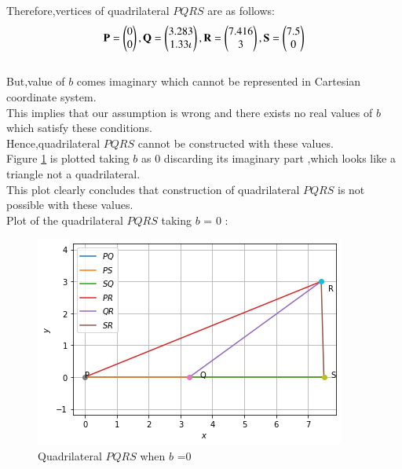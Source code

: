 \documentclass[journal,12pt,twocolumn]{IEEEtran}
\begin{document}
Therefore,vertices of quadrilateral $PQRS$ are as follows:
\begin{align}
\mathbf{P} = \begin{pmatrix}0\\0\end{pmatrix}, \mathbf{Q} = \begin{pmatrix}3.283\\1.33\iota\end{pmatrix}, \mathbf{R} = \begin{pmatrix}7.416\\3\end{pmatrix},\mathbf{S} = \begin{pmatrix}7.5\\0\end{pmatrix}
\end{align}
\\
But,value of $b$ comes imaginary which cannot be represented in Cartesian coordinate system.
\\
This implies that our assumption is wrong and there exists no real values of $b$ which satisfy these conditions. 
\\
Hence,quadrilateral $PQRS$ cannot be constructed with these values.
\\
Figure \ref{fig:quadrilateral} is plotted taking $b$ as 0 discarding its imaginary part ,which looks like a triangle not a quadrilateral.
\\
This plot clearly concludes that construction of quadrilateral $PQRS$ is not possible with these values.
\\
Plot of the quadrilateral $PQRS$ taking $b$ = 0 :
\begin{figure}[!ht]
\centering
\includegraphics[width=\columnwidth]{Figure2}
\caption{Quadrilateral $PQRS$ when $b$ =0}
\label{fig:quadrilateral}	
\end{figure}
\end{document}

